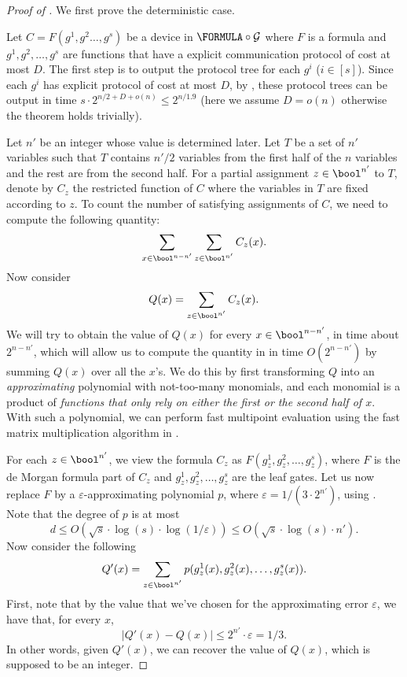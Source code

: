 	\begin{proof}[Proof of ]
    	We first prove the deterministic case.
    	
    	Let $C=F(g^1,g^2\dots,g^s)$ be a device in $\FORMULA\circ\mathcal{G}$ where $F$ is a formula and $g^1,g^2,\dots,g^s$ are functions that have a explicit communication protocol of cost at most $D$.
        The first step is to output the protocol tree for each $g^i$ ($i\in[s]$). Since each $g^i$ has explicit protocol of cost at most $D$, by , these protocol trees can be output in time $s\cdot 2^{n/2+D+o(n)}\leq 2^{n/1.9}$ (here we assume $D = o(n)$ otherwise the theorem holds trivially).
    
    	Let $n'$ be an integer whose value is determined later. Let $T$ be a set of $n'$ variables such that $T$ contains $n'/2$ variables from the first half of the $n$ variables and the rest are from the second half. For a partial assignment $z\in\bool^{n'}$ to $T$, denote by $C_z$ the restricted function of $C$ where the variables in $T$ are fixed according to $z$. To count the number of satisfying assignments of $C$, we need to compute the following quantity:
		\begin{equation}\label{eq:sat-1}
			\sum_{x\in\bool^{n-n'}} \sum_{z\in\bool^{n'}} C_z(x).
		\end{equation}
		Now consider
		\[
			Q(x) = \sum_{z\in\bool^{n'}} C_z(x).
		\]
		We will try to obtain the value of $Q(x)$ for every $x\in\bool^{n-n'}$, in time about $2^{n-n'}$, which will allow us to compute the quantity in  in time $O(2^{n-n'})$ by summing $Q(x)$ over all the $x$'s. We do this by first transforming $Q$ into an \emph{approximating} polynomial with not-too-many monomials, and each monomial is a product of \emph{functions that only rely on either the first or the second half of $x$}. With such a polynomial, we can perform fast multipoint evaluation using the fast matrix multiplication algorithm in .

		For each $z\in\bool^{n'}$, we view the formula $C_z$ as $F(g^1_z,g^2_z,\dots,g^s_z)$, where $F$ is the de Morgan formula part of $C_z$ and $g^1_z,g^2_z,\dots,g^s_z$ are the leaf gates. Let us now replace $F$ by a $\varepsilon$-approximating polynomial $p$, where $\varepsilon = 1/\left(3\cdot 2^{n'}\right)$, using . Note that the degree of $p$ is at most 
		\[
		    d\leq O(\sqrt{s}\cdot\log(s)\cdot\log(1/\varepsilon))\leq O(\sqrt{s}\cdot\log(s)\cdot n').
		\]
		Now consider the following
		\[
			Q'(x)= \sum_{z\in\bool^{n'}} p(g^1_z(x),g^2_z(x),\dots,g^s_z(x)).
		\]
		First, note that by the value that we've chosen for the approximating error $\varepsilon$, we have that, for every $x$,
		\[
			\left|Q'(x)-Q(x)\right|\leq 2^{n'}\cdot \varepsilon= 1/3.
		\]
		In other words, given $Q'(x)$, we can recover the value of $Q(x)$, which is supposed to be an integer.


\end{proof}
